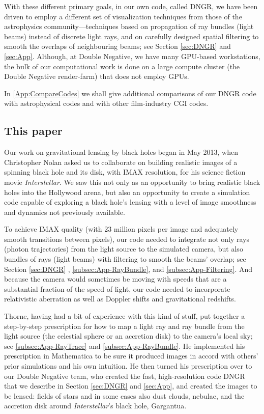 \documentclass[12pt]{iopart}
\begin{document}
With these 
different primary goals, in our own code, called DNGR, we have been driven to employ a different set of visualization
techniques from those of the astrophysics community---techniques based 
on propagation of ray bundles (light beams) instead of discrete light rays,
and on carefully designed spatial filtering to smooth the overlaps of neighbouring
beams; see Section \ref{sec:DNGR} and \ref{sec:App}.  Although, at Double Negative, we have
many GPU-based workstations, the bulk of our computational work
is done on a large compute cluster (the Double Negative render-farm)
that does not employ GPUs.  

In \ref{App:CompareCodes} we
shall give additional comparisons of our DNGR code with astrophysical codes and with other film-industry CGI codes.
 
\subsection{This paper}
\label{subsec:ThisPaper}

Our  work on gravitational lensing by black holes began in May 2013, when Christopher Nolan asked us to collaborate on building realistic images of a spinning black hole and its disk, with IMAX resolution, for his science fiction movie 
{\it Interstellar}.  We saw this  not only as an opportunity to bring realistic black holes
into the Hollywood arena, but also an opportunity to create a simulation code capable
of exploring a black hole's lensing with a level of image smoothness and dynamics not
previously available.

To achieve IMAX quality (with 23 million pixels per image and adequately smooth transitions between pixels), our code needed to integrate not only
rays (photon trajectories) from the light source to the simulated camera, but also bundles of  rays (light beams) with filtering to smooth the beams' overlap; see Section \ref{sec:DNGR} ,  \ref{subsec:App-RayBundle}, and \ref{subsec:App-Filtering}. 
And because the camera would sometimes be moving with speeds that are a substantial 
fraction of the speed of light, our code needed to incorporate relativistic aberration as well as Doppler shifts and gravitational redshifts.

Thorne, having had a bit of experience with this kind of stuff, put together a step-by-step prescription for how to map a light ray and ray bundle from the light source (the celestial sphere or 
an accretion disk) to the camera's local sky; see \ref{subsec:App-RayTrace} and \ref{subsec:App-RayBundle}.  He implemented
his prescription in Mathematica to be sure it produced images in accord with others'
prior simulations and his own intuition.  He then turned his prescription over to our Double Negative team, who created the fast, high-resolution code DNGR that we describe in
Section \ref{sec:DNGR} and \ref{sec:App}, and created the images to be lensed:  fields of stars and in some cases
also dust clouds, nebulae, and the accretion disk around {\it Interstellar}'s black hole, Gargantua.
\end{document}
